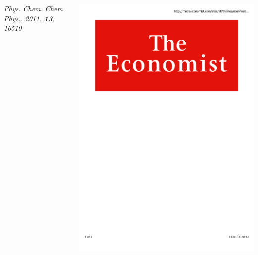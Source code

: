 \documentclass[mathserif,8pt]{beamer}
\begin{document}
\begin{frame}
\begin{columns}
\begin{column}{.60\textwidth}
	\scriptsize{\it{Phys. Chem. Chem. Phys.}, 2011, \textbf{13}, 16510}
    \end{column}
    \begin{column}{.40\textwidth}
	\centering
	\includegraphics[viewport = 0 550 600 800, clip, scale=0.1]{figures/economist_logo.pdf}\\

\end{column}
\end{columns}
\end{frame}
\end{document}
